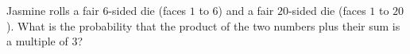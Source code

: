 Jasmine rolls a fair $6$-sided die (faces $1$ to $6$) and a fair $20$-sided die (faces $1$ to $20$). What is the probability that the product of the two numbers plus their sum is a multiple of $3$?
